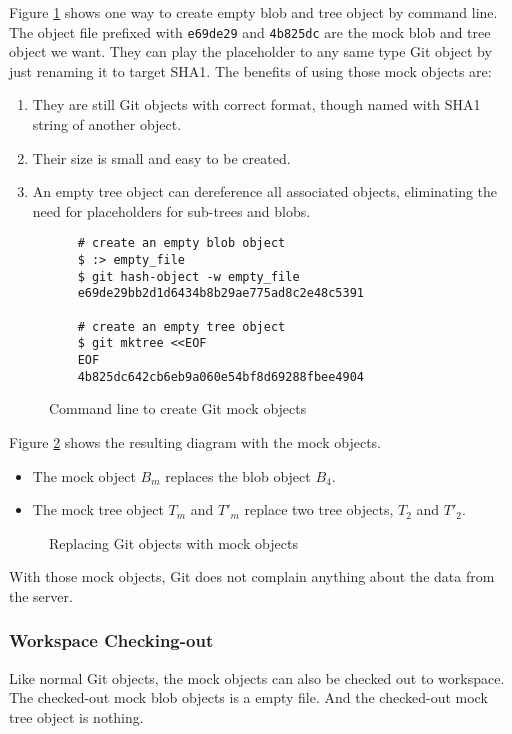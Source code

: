 \documentclass[preprint]{sigplanconf}
\begin{document}
Figure \ref{fig:cmd-create-mock} shows one way to create empty blob and tree
object by command line.
The object file prefixed with \verb|e69de29| and \verb|4b825dc| are the mock
blob and tree object we want.
They can play the placeholder to any same type Git object by just renaming it
to target SHA1.
The benefits of using those mock objects are:
\begin{enumerate}
  \item They are still Git objects with correct format, though named with SHA1
    string of another object.
  \item Their size is small and easy to be created.
  \item An empty tree object can dereference all associated objects,
    eliminating the need for placeholders for sub-trees and blobs.
\end{enumerate}


\begin{figure}[htpb]
  \centering
  \begin{verbatim}
    # create an empty blob object
    $ :> empty_file
    $ git hash-object -w empty_file
    e69de29bb2d1d6434b8b29ae775ad8c2e48c5391

    # create an empty tree object
    $ git mktree <<EOF
    EOF
    4b825dc642cb6eb9a060e54bf8d69288fbee4904
  \end{verbatim}
  \caption{Command line to create Git mock objects}
  \label{fig:cmd-create-mock}
\end{figure}

Figure \ref{fig:mock-objects} shows the resulting diagram with the mock
objects.

\begin{itemize}
  \item The mock object $B_m$ replaces the blob object $B_4$.
  \item The mock tree object $T_m$ and $T'_m$ replace two tree objects, $T_2$
    and $T'_2$.
\end{itemize}

\begin{figure}[htpb]
  \centering
  
  \caption{Replacing Git objects with mock objects}
  \label{fig:mock-objects}
\end{figure}

With those mock objects, Git does not complain anything about the data from the
server.

\subsubsection{Workspace Checking-out}
Like normal Git objects, the mock objects can also be checked out to workspace.
The checked-out mock blob objects is a empty file.
And the checked-out mock tree object is nothing.
\end{document}
